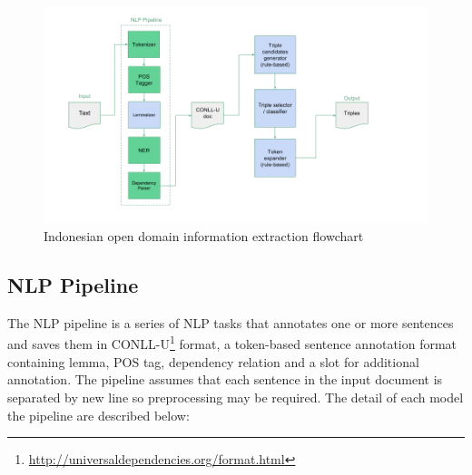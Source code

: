 \documentclass[peerreview,12pt]{IEEEtran}
\begin{document}
\begin{figure}
\centering
\includegraphics[width=\textwidth]{program_flowchart}
\caption{Indonesian open domain information extraction flowchart}
\label{fig_program_flowchart}
\end{figure}

\subsection{NLP Pipeline}

The NLP pipeline is a series of NLP tasks that annotates one or more sentences and saves them in CONLL-U\footnote{\url{http://universaldependencies.org/format.html}} format, a token-based sentence annotation format containing lemma, POS tag, dependency relation and a slot for additional annotation. The pipeline assumes that each sentence in the input document is separated by new line so preprocessing may be required. The detail of each model the pipeline are described below:
\end{document}
